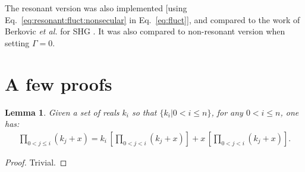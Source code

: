 \documentclass[12pt,a4paper]{article}
\begin{document}
The resonant version was also implemented [using Eq.~\eqref{eq:resonant:fluct:nonsecular} in Eq.~\eqref{eq:fluct}], and compared to the work of Berkovic \textit{et al.} for SHG \cite{berkovicMeasurementAnalysisMolecular2000}. It was also compared to non-resonant version when setting $\Gamma = 0$.






\clearpage
\appendix
\section{A few proofs}
\setcounter{equation}{0} 
\renewcommand{\theequation}{A\arabic{equation}}

\newtheorem{theorem}{Theorem}[section]
\newtheorem{lemma}[theorem]{Lemma}

\begin{lemma}\label{lem:1}
	Given a set of reals $k_i$ so that $\{k_i|0<i\leq n\}$,  for any $0<i\leq n$, one has:\begin{align}
		\prod_{0<j\leq i} (k_j+x)= k_{i}\,\left[\prod_{0<j<i} (k_j+x) \right] + x\,\left[\prod_{0<j<i} (k_j+x) \right].\label{eq:p1:ind}
	\end{align}
\end{lemma}
\begin{proof}
	Trivial.
\end{proof}
\end{document}
